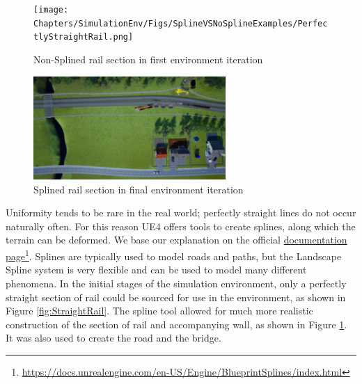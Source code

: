 \begin{figure}
    \centering
    \texttt{[image: Chapters/SimulationEnv/Figs/SplineVSNoSplineExamples/PerfectlyStraightRail.png]}
    \caption{Non-Splined rail section in first environment iteration}
    \label{fig:StraightRail}
    \includegraphics[width=0.65\textwidth]{Chapters/SimulationEnv/Figs/SplineVSNoSplineExamples/resized_SplineExample1.png}
    \caption{Splined rail section in final environment iteration}\label{fig:SplinedRail}
    
\end{figure}

Uniformity tends to be rare in the real world; perfectly straight lines do not occur naturally often. For this reason UE4 offers tools to create splines, along which the terrain can be deformed. We base our explanation on the official \href{https://docs.unrealengine.com/en-US/Engine/BlueprintSplines/index.html}{documentation page}\footnote{\href {https://docs.unrealengine.com/en-US/Engine/BlueprintSplines/index.html}{https://docs.unrealengine.com/en-US/Engine/BlueprintSplines/index.html}}. Splines are typically used to model roads and paths, but the Landscape Spline system is very flexible and can be used to model many different phenomena. In the initial stages of the simulation environment, only a perfectly straight section of rail could be sourced for use in the environment, as shown in Figure \ref{fig:StraightRail}. The spline tool allowed for much more realistic construction of the section of rail and accompanying wall, as shown in Figure \ref{fig:SplinedRail}. It was also used to create the road and the bridge. %
%

